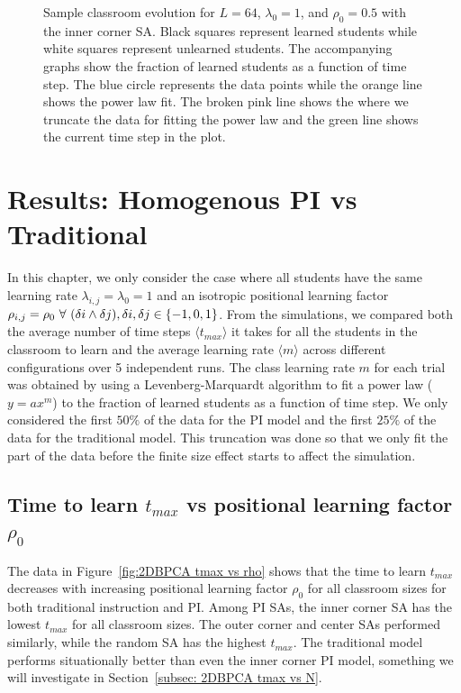 \begin{figure}[htbp!]
    \caption[Example classroom evolution for the homogenous PI set up]{Sample classroom evolution for $L=64$, $\lambda_0 = 1$, and $\rho_0 = 0.5$ with the inner corner SA. 
    Black squares represent learned students while white squares represent unlearned students. 
    The accompanying graphs show the fraction of learned students as a function of time step. 
    The blue circle represents the data points while the orange line shows the power law fit. 
    The broken pink line shows the where we truncate the data for fitting the power law and the green line shows the current time step in the plot.}
    \label{fig:Sample classroom evolution}
 \end{figure}

\section{Results: Homogenous PI vs Traditional}
In this chapter, we only consider the case where all students have the same learning rate $\lambda_{i,j} = \lambda_0 = 1$ and an isotropic positional learning factor $\rho_{i,j} = \rho_0 \space ~\forall~ (\delta i \land \delta j),  \delta i, \delta j \in \lbrace -1,0,1 \rbrace $. 
From the simulations, we compared both the average number of time steps $\langle t_{max} \rangle$ it takes for all the students in the classroom to learn and the average learning rate $\langle m \rangle$ across different configurations over 5 independent runs.
 The class learning rate $m$ for each trial was obtained by using a Levenberg-Marquardt algorithm to fit a power law ($y = ax^m$) to the fraction of learned students as a function of time step. 
 We only considered the first $50\%$ of the data for the PI model and the first $25\%$ of the data for the traditional model. 
This truncation was done so that we only fit the part of the data before the finite size effect starts to affect the simulation.

\subsection{Time to learn $t_{max}$ vs positional learning factor $\rho_0$} \label{subsec: 2DBPCA tmax vs rho}

The data in Figure~\ref{fig:2DBPCA tmax vs rho} shows that the time to learn $t_{max}$ decreases with increasing positional learning factor $\rho_0$ for all classroom sizes for both traditional instruction and PI. 
Among PI SAs, the inner corner SA has the lowest $t_{max}$ for all classroom sizes. 
The outer corner and center SAs performed similarly, while the random SA has the highest $t_{max}$. 
The traditional model performs situationally better than even the inner corner PI model, something we will investigate in Section~\ref{subsec: 2DBPCA tmax vs N}.


